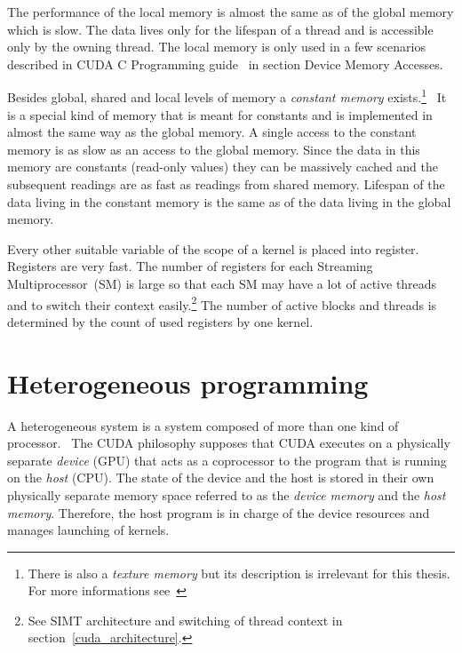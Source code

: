\documentclass[12pt,twoside]{fithesis2}
\begin{document}
The performance of the local memory is almost the same as of the global memory which is slow. The data lives only for the lifespan of a thread and is accessible only by the owning thread. The local memory is only used in a few scenarios described in CUDA C Programming guide~\cite{cuda_guide} in section Device Memory Accesses.

Besides global, shared and local levels of memory a \emph{constant memory} exists.\footnote{There is also a \emph{texture memory} but its description is irrelevant for this thesis. For more informations see~\cite{cuda_guide}}~\cite{cuda_guide} It is a special kind of memory that is meant for constants and is implemented in almost the same way as the global memory. A single access to the constant memory is as slow as an access to the global memory. Since the data in this memory are constants (read-only values) they can be massively cached and the subsequent readings are as fast as readings from shared memory. Lifespan of the data living in the constant memory is the same as of the data living in the global memory.

Every other suitable variable of the scope of a kernel is placed into register. Registers are very fast. The number of registers for each Streaming Multiprocessor~(SM) is large so that each SM may have a lot of active threads and to switch their context easily.\footnote{See SIMT architecture and switching of thread context in section~\ref{cuda_architecture}.} The number of active blocks and threads is determined by the count of used registers by one kernel.

\section{Heterogeneous programming}
\label{heterogeneous_programming}

A heterogeneous system is a system composed of more than one kind of processor.~\cite{professional_cuda} The CUDA philosophy supposes that CUDA executes on a physically separate \emph{device} (GPU) that acts as a coprocessor to the program that is running on the \emph{host} (CPU). The state of the device and the host is stored in their own physically separate memory space referred to as the \emph{device memory} and the \emph{host memory}. Therefore, the host program is in charge of the device resources and manages launching of kernels.~\cite{cuda_guide}
\end{document}
